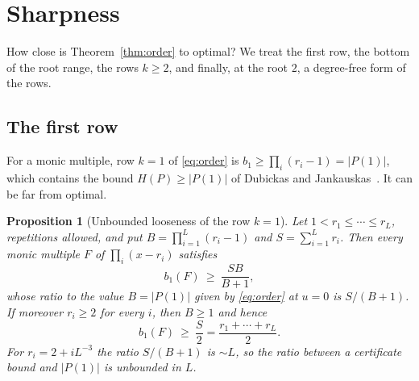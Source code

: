 \documentclass[11pt]{article}
\newtheorem{proposition}[theorem]{Proposition}
\begin{document}
\section{Sharpness}\label{sec:sharp}

How close is Theorem~\ref{thm:order} to optimal?  We treat the first row,
the bottom of the root range, the rows $k\ge2$, and finally, at the root
$2$, a degree-free form of the rows.

\subsection{The first row}

For a monic multiple, row $k=1$ of \eqref{eq:order} is
$b_1\ge\prod_i(r_i-1)=|P(1)|$, which contains the bound $H(P)\ge|P(1)|$ of
Dubickas and Jankauskas~\cite{dj}.  It can be far from optimal.

\begin{proposition}[Unbounded looseness of the row $k=1$]
\label{prop:unbounded}
Let $1<r_1\le\cdots\le r_L$, repetitions allowed, and put
$B=\prod_{i=1}^L(r_i-1)$ and $S=\sum_{i=1}^Lr_i$.  Then every monic multiple
$F$ of $\prod_i(x-r_i)$ satisfies
\[
  b_1(F)\ \ge\ \frac{SB}{B+1},
\]
whose ratio to the value $B=|P(1)|$ given by \eqref{eq:order} at $u=0$ is
$S/(B+1)$.  If moreover $r_i\ge2$ for every $i$, then $B\ge1$ and hence
\begin{equation}\label{eq:halfsum}
  b_1(F)\ \ge\ \frac S2=\frac{r_1+\cdots+r_L}2 .
\end{equation}
For $r_i=2+iL^{-3}$ the ratio $S/(B+1)$ is $\sim L$, so the ratio
between a certificate bound and $|P(1)|$ is unbounded in $L$.
\end{proposition}
\end{document}
